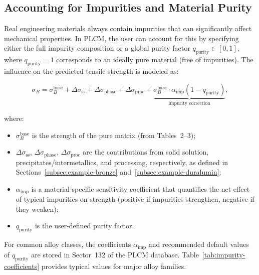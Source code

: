 \documentclass[12pt,a4paper]{article}
\begin{document}
	\subsection{Accounting for Impurities and Material Purity}
	\label{subsec:purity}
	
	Real engineering materials always contain impurities that can significantly affect mechanical properties. In PLCM, the user can account for this by specifying either the full impurity composition or a global purity factor \(q_{\mathrm{purity}} \in [0,1]\), where \(q_{\mathrm{purity}}=1\) corresponds to an ideally pure material (free of impurities). The influence on the predicted tensile strength is modeled as:
	
	\[
	\sigma_B = \sigma_B^{\mathrm{base}} + \Delta\sigma_{\mathrm{ss}} + \Delta\sigma_{\mathrm{phase}} + \Delta\sigma_{\mathrm{proc}} + \underbrace{\sigma_B^{\mathrm{base}} \cdot \alpha_{\mathrm{imp}} (1 - q_{\mathrm{purity}})}_{\text{impurity correction}},
	\]
	
	where:
	\begin{itemize}
		\item \(\sigma_B^{\mathrm{base}}\) is the strength of the pure matrix (from Tables~2--3);
		\item \(\Delta\sigma_{\mathrm{ss}}\), \(\Delta\sigma_{\mathrm{phase}}\), \(\Delta\sigma_{\mathrm{proc}}\) are the contributions from solid solution, precipitates/intermetallics, and processing, respectively, as defined in Sections~\ref{subsec:example-bronze} and~\ref{subsec:example-duralumin};
		\item \(\alpha_{\mathrm{imp}}\) is a material-specific sensitivity coefficient that quantifies the net effect of typical impurities on strength (positive if impurities strengthen, negative if they weaken);
		\item \(q_{\mathrm{purity}}\) is the user-defined purity factor.
	\end{itemize}
	
	For common alloy classes, the coefficients \(\alpha_{\mathrm{imp}}\) and recommended default values of \(q_{\mathrm{purity}}\) are stored in Sector~132 of the PLCM database. Table~\ref{tab:impurity-coefficients} provides typical values for major alloy families.
	
\end{document}
